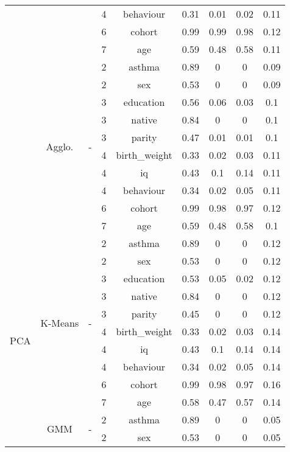 \documentclass[CAT,BIB]{TFUOC}%
\begin{document}
\begin{table}
\begin{tabular}{@{}ccccccccc@{}}
            &  &  & 4 & behaviour & 0.31 & 0.01 & 0.02 & 0.11 \\
            &  &  & 6 & cohort & 0.99 & 0.99 & 0.98 & 0.12 \\
            &  &  & 7 & age & 0.59 & 0.48 & 0.58 & 0.11 \\ \cmidrule(l){2-9}
            & \multirow{10}{*}{Agglo.} & \multirow{10}{*}{-} & 2 & asthma & 0.89 & 0 & 0 & 0.09 \\
            &  &  & 2 & sex & 0.53 & 0 & 0 & 0.09 \\
            &  &  & 3 & education & 0.56 & 0.06 & 0.03 & 0.1 \\
            &  &  & 3 & native & 0.84 & 0 & 0 & 0.1 \\
            &  &  & 3 & parity & 0.47 & 0.01 & 0.01 & 0.1 \\
            &  &  & 4 & birth\_weight & 0.33 & 0.02 & 0.03 & 0.11 \\
            &  &  & 4 & iq & 0.43 & 0.1 & 0.14 & 0.11 \\
            &  &  & 4 & behaviour & 0.34 & 0.02 & 0.05 & 0.11 \\
            &  &  & 6 & cohort & 0.99 & 0.98 & 0.97 & 0.12 \\
            &  &  & 7 & age & 0.59 & 0.48 & 0.58 & 0.1 \\ \midrule
            \multirow{30}{*}{PCA} & \multirow{10}{*}{K-Means} & \multirow{10}{*}{-} & 2 & asthma & 0.89 & 0 & 0 & 0.12 \\
            &  &  & 2 & sex & 0.53 & 0 & 0 & 0.12 \\
            &  &  & 3 & education & 0.53 & 0.05 & 0.02 & 0.12 \\
            &  &  & 3 & native & 0.84 & 0 & 0 & 0.12 \\
            &  &  & 3 & parity & 0.45 & 0 & 0 & 0.12 \\
            &  &  & 4 & birth\_weight & 0.33 & 0.02 & 0.03 & 0.14 \\
            &  &  & 4 & iq & 0.43 & 0.1 & 0.14 & 0.14 \\
            &  &  & 4 & behaviour & 0.34 & 0.02 & 0.05 & 0.14 \\
            &  &  & 6 & cohort & 0.99 & 0.98 & 0.97 & 0.16 \\
            &  &  & 7 & age & 0.58 & 0.47 & 0.57 & 0.14 \\ \cmidrule(l){2-9}
            & \multirow{10}{*}{GMM} & \multirow{10}{*}{-} & 2 & asthma & 0.89 & 0 & 0 & 0.05 \\
            &  &  & 2 & sex & 0.53 & 0 & 0 & 0.05 \\

\end{tabular}
\end{table}
\end{document}
